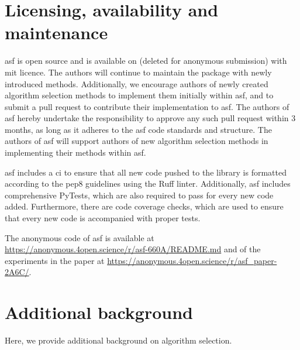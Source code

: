



% 
% 
% 




\section{Licensing, availability and maintenance}
\Gls{asf} is open source and is available on (deleted for anonymous submission) with \gls{mit} licence.
The authors will continue to maintain the package with newly introduced methods. Additionally, we encourage authors of newly created algorithm selection methods to implement them initially within \gls{asf}, and to submit a pull request to contribute their implementation to \gls{asf}. The authors of \gls{asf} hereby undertake the responsibility to approve any such pull request within 3 months, as long as it adheres to the \gls{asf} code standards and structure. The authors of \gls{asf} will support authors of new algorithm selection methods in implementing their methods within \gls{asf}.

\Gls{asf} includes a \gls{ci} to ensure that all new code pushed to the library is formatted according to the \gls{pep8} guidelines using the Ruff linter. Additionally, \gls{asf} includes comprehensive PyTests, which are also required to pass for every new code added. Furthermore, there are code coverage checks, which are used to ensure that every new code is accompanied with proper tests.

The anonymous code of \gls{asf} is available at \url{https://anonymous.4open.science/r/asf-660A/README.md} and of the experiments in the paper at
\url{https://anonymous.4open.science/r/asf_paper-2A6C/}.

\section{Additional background}\label{sec:add_background}
Here, we provide additional background on algorithm selection.
